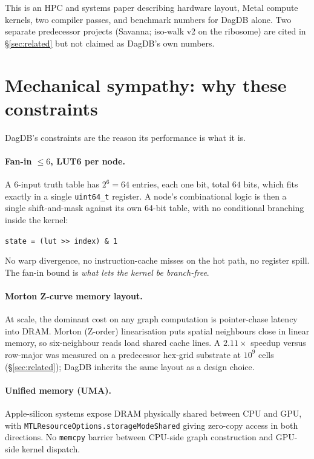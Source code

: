 \documentclass[11pt]{article}
\begin{document}
This is an HPC and systems paper describing hardware layout, Metal
compute kernels, two compiler passes, and benchmark numbers for
DagDB alone. Two separate predecessor projects (Savanna; iso-walk v2
on the ribosome) are cited in \S\ref{sec:related} but not claimed as
DagDB's own numbers.

\section{Mechanical sympathy: why these constraints}
\label{sec:sympathy}

DagDB's constraints are the reason its performance is what it is.

\paragraph{Fan-in $\leq 6$, LUT6 per node.} A 6-input truth table has
$2^{6}=64$ entries, each one bit, total $64$ bits, which fits exactly
in a single \texttt{uint64\_t} register. A node's combinational logic
is then a single shift-and-mask against its own 64-bit table, with no
conditional branching inside the kernel:
\begin{center}
\texttt{state = (lut >> index) \& 1}
\end{center}
No warp divergence, no instruction-cache misses on the hot path, no
register spill. The fan-in bound is \emph{what lets the kernel be
branch-free}.

\paragraph{Morton Z-curve memory layout.} At scale, the dominant cost
on any graph computation is pointer-chase latency into DRAM. Morton
(Z-order) linearisation puts spatial neighbours close in linear
memory, so six-neighbour reads load shared cache lines. A $2.11\times$
speedup versus row-major was measured on a predecessor hex-grid
substrate at $10^{9}$ cells (\S\ref{sec:related}); DagDB inherits the
same layout as a design choice.

\paragraph{Unified memory (UMA).} Apple-silicon systems expose DRAM
physically shared between CPU and GPU, with
\texttt{MTLResourceOptions.storageModeShared} giving zero-copy access
in both directions. No \texttt{memcpy} barrier between CPU-side graph
construction and GPU-side kernel dispatch.
\end{document}
